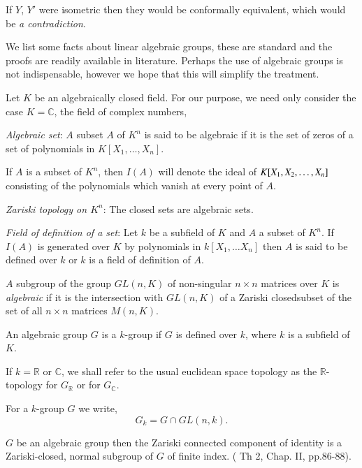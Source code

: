 If $Y$, $Y'$ were isometric then they would be conformally equivalent,
which would be \textit{a contradiction}.

We list some facts about linear algebraic groups, these are standard
and the proofs are readily available in literature. Perhaps the use of
algebraic groups is not indispensable, however we hope that this will
simplify the treatment. 

Let $K$ be an algebraically closed field. For our purpose, we need
only consider the case $K= \mathbb{C}$, the field of complex numbers, 


\textit{Algebraic set}: $A$ subset $A$ of $K^n$ is said to be
algebraic if it is the set of zeros of a set of polynomials in $K[X_1,
\ldots , X_n]$.

If $A$ is a subset of $K^n$, then $I(A)$ will denote the ideal of
$K[X_1, X_2, \ldots,\break X_n]$ consisting of the polynomials which vanish
at every point of $A$.

\textit{Zariski topology on $K^n$}: The closed sets are algebraic
sets.

\textit{Field of definition of a set}: Let $k$ be a subfield of $K$
and $A$ a subset of $K^n$. If $I(A)$ is generated over $K$ by
polynomials in $k[X_1, \ldots X_n]$ then $A$ is said to be defined
over $k$ or $k$ is a field of definition of $A$.

$A$ subgroup of the group $GL(n, K)$ of non-singular $n \times n$
matrices over $K$ is \textit{algebraic} if it is the intersection with
$GL(n, K)$ of a Zariski closed\pageoriginale subset of the set of all $n \times n$
matrices $M(n, K)$.

An algebraic group $G$ is a $k$-group if $G$ is defined over $k$,
where $k$ is a subfield of $K$.


If $k = \mathbb{R}$ or $\mathbb{C}$, we shall refer to the usual
euclidean space topology as the $\mathbb{R}$-topology for
$G_{\mathbb{R}}$ or for $G_{\mathbb{C}}$.

For a $k$-group $G$ we write,
$$
G_k = G \cap GL (n, k).
$$

\begin{thm}\label{chap0:thm0.2} %
  $G$ be an algebraic group then the Zariski connected component of
  identity is a Zariski-closed, normal subgroup of $G$ of finite
  index. (\cite{5} Th 2, Chap. II, pp.86-88). 
\end{thm}

